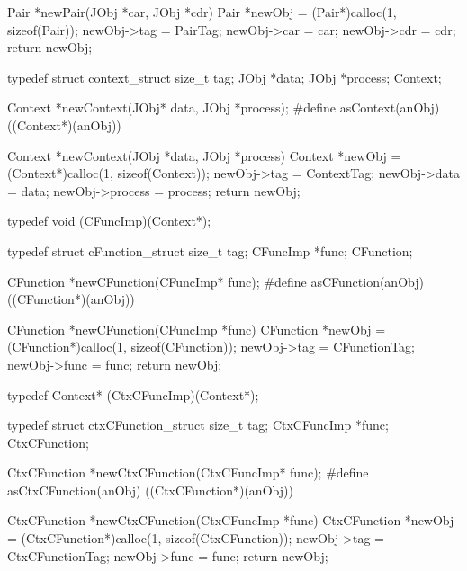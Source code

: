 \startCCode
Pair *newPair(JObj *car, JObj *cdr) {
  Pair *newObj = (Pair*)calloc(1, sizeof(Pair));
  newObj->tag = PairTag;
  newObj->car = car;
  newObj->cdr = cdr;
  return newObj;
}
\stopCCode

\startCHeader
typedef struct context_struct {
  size_t tag;
  JObj  *data;
  JObj  *process;
} Context;

Context *newContext(JObj* data, JObj *process);
#define asContext(anObj) ((Context*)(anObj))
\stopCHeader

\startCCode
Context *newContext(JObj *data, JObj *process) {
  Context *newObj = (Context*)calloc(1, sizeof(Context));
  newObj->tag     = ContextTag;
  newObj->data    = data;
  newObj->process = process;
  return newObj;
}
\stopCCode

\startCHeader
typedef void (CFuncImp)(Context*);

typedef struct cFunction_struct {
  size_t    tag;
  CFuncImp *func;
} CFunction;

CFunction *newCFunction(CFuncImp* func);
#define asCFunction(anObj) ((CFunction*)(anObj))
\stopCHeader

\startCCode
CFunction *newCFunction(CFuncImp *func) {
  CFunction *newObj = (CFunction*)calloc(1, sizeof(CFunction));
  newObj->tag  = CFunctionTag;
  newObj->func = func;
  return newObj;
}
\stopCCode

\startCHeader
typedef Context* (CtxCFuncImp)(Context*);

typedef struct ctxCFunction_struct {
  size_t       tag;
  CtxCFuncImp *func;
} CtxCFunction;

CtxCFunction *newCtxCFunction(CtxCFuncImp* func);
#define asCtxCFunction(anObj) ((CtxCFunction*)(anObj))
\stopCHeader

\startCCode
CtxCFunction *newCtxCFunction(CtxCFuncImp *func) {
  CtxCFunction *newObj = (CtxCFunction*)calloc(1, sizeof(CtxCFunction));
  newObj->tag  = CtxCFunctionTag;
  newObj->func = func;
  return newObj;
}
\stopCCode
